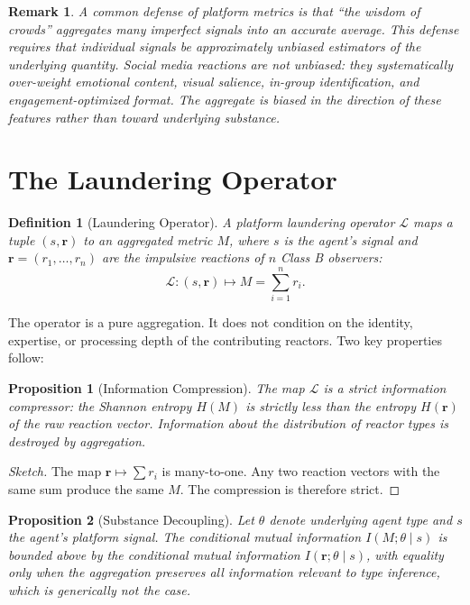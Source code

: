 \documentclass[11pt]{article}
\newtheorem{definition}{Definition}
\newtheorem{remark}{Remark}
\newtheorem{proposition}{Proposition}
\begin{document}
\begin{remark}
A common defense of platform metrics is that ``the wisdom of crowds'' aggregates many imperfect signals into an accurate average. This defense requires that individual signals be approximately unbiased estimators of the underlying quantity. Social media reactions are not unbiased: they systematically over-weight emotional content, visual salience, in-group identification, and engagement-optimized format. The aggregate is biased in the direction of these features rather than toward underlying substance.
\end{remark}

\section{The Laundering Operator}

\begin{definition}[Laundering Operator]
\label{def:laundering}
A platform laundering operator $\mathcal{L}$ maps a tuple $(s, \mathbf{r})$ to an aggregated metric $M$, where $s$ is the agent's signal and $\mathbf{r} = (r_1, \ldots, r_n)$ are the impulsive reactions of $n$ Class B observers:
\[
\mathcal{L}: (s, \mathbf{r}) \mapsto M = \sum_{i=1}^{n} r_i.
\]
\end{definition}

The operator is a pure aggregation. It does not condition on the identity, expertise, or processing depth of the contributing reactors. Two key properties follow:

\begin{proposition}[Information Compression]
\label{prop:compression}
The map $\mathcal{L}$ is a strict information compressor: the Shannon entropy $H(M)$ is strictly less than the entropy $H(\mathbf{r})$ of the raw reaction vector. Information about the distribution of reactor types is destroyed by aggregation.
\end{proposition}

\begin{proof}[Sketch]
The map $\mathbf{r} \mapsto \sum r_i$ is many-to-one. Any two reaction vectors with the same sum produce the same $M$. The compression is therefore strict.
\end{proof}

\begin{proposition}[Substance Decoupling]
\label{prop:decoupling}
Let $\theta$ denote underlying agent type and $s$ the agent's platform signal. The conditional mutual information $I(M; \theta \mid s)$ is bounded above by the conditional mutual information $I(\mathbf{r}; \theta \mid s)$, with equality only when the aggregation preserves all information relevant to type inference, which is generically not the case.
\end{proposition}
\end{document}
